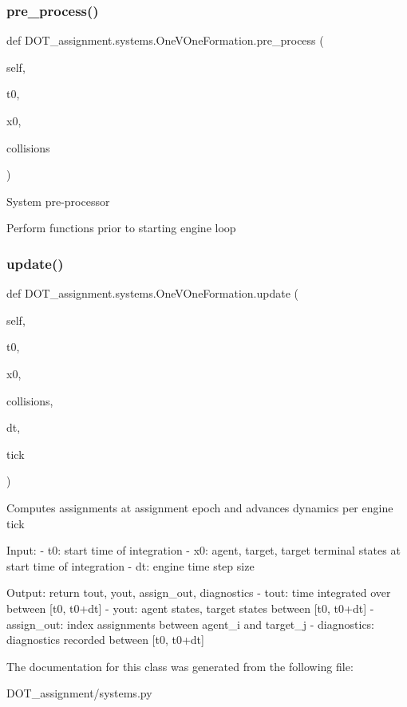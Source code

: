 \subsubsection{\texorpdfstring{pre\_process()}{pre\_process()}}
{\footnotesize\ttfamily def D\+O\+T\+\_\+assignment.\+systems.\+One\+V\+One\+Formation.\+pre\+\_\+process (\begin{DoxyParamCaption}\item[{}]{self,  }\item[{}]{t0,  }\item[{}]{x0,  }\item[{}]{collisions }\end{DoxyParamCaption})}

\begin{DoxyVerb}System pre-processor

Perform functions prior to starting engine loop
\end{DoxyVerb}
 \mbox{\label{class_d_o_t__assignment_1_1systems_1_1_one_v_one_formation_a788744bbae34f3f53226e4cfb5c321cf}} 
\subsubsection{\texorpdfstring{update()}{update()}}
{\footnotesize\ttfamily def D\+O\+T\+\_\+assignment.\+systems.\+One\+V\+One\+Formation.\+update (\begin{DoxyParamCaption}\item[{}]{self,  }\item[{}]{t0,  }\item[{}]{x0,  }\item[{}]{collisions,  }\item[{}]{dt,  }\item[{}]{tick }\end{DoxyParamCaption})}

\begin{DoxyVerb}Computes assignments at assignment epoch and advances dynamics per engine tick

Input:
- t0:           start time of integration
- x0:           agent, target, target terminal states at start time of integration
- dt:           engine time step size

Output:
return tout, yout, assign_out, diagnostics
- tout:         time integrated over between [t0, t0+dt]
- yout:         agent states, target states between [t0, t0+dt]
- assign_out:   index assignments between agent_i and target_j
- diagnostics:  diagnostics recorded between [t0, t0+dt]\end{DoxyVerb}
 

The documentation for this class was generated from the following file\+:\begin{DoxyCompactItemize}
\item 
D\+O\+T\+\_\+assignment/systems.\+py\end{DoxyCompactItemize}
